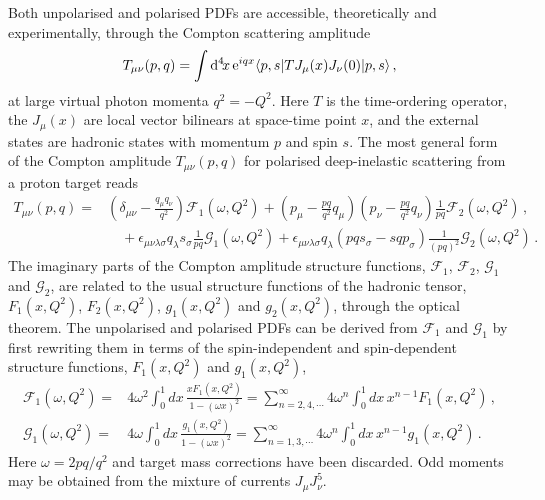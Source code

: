 Both unpolarised and polarised PDFs are accessible, theoretically and experimentally,
through the Compton scattering amplitude
\begin{equation}
T_{\mu\nu}(p,q) = \int {\rm d}^4\!x\, {\rm e}^{iqx}  \langle p,s |T J_\mu(x) J_\nu(0)|p,s\rangle   \, ,
\end{equation}
at large virtual photon momenta $q^2=-Q^2$. Here $T$ is the time-ordering operator, the $J_\mu(x)$ are local vector bilinears at space-time point $x$, and the external states are hadronic states with momentum $p$ and spin $s$.
%
The most general form of the Compton amplitude $T_{\mu\nu}(p,q)$ for polarised deep-inelastic scattering from a proton target reads
\begin{align}
T_{\mu\nu}(p,q) = {} & \left(\delta_{\mu\nu}-\frac{q_\mu q_\nu}{q^2}\right) \mathcal{F}_1(\omega,Q^2) + \left(p_\mu-\frac{pq}{q^2}q_\mu\right) \left(p_\nu-\frac{pq}{q^2}q_\nu\right) \frac{1}{pq} \mathcal{F}_2(\omega,Q^2)\,,\\ 
& {} \quad  + \epsilon_{\mu\nu\lambda\sigma}q_\lambda s_\sigma \frac{1}{pq}\mathcal{G}_1(\omega,Q^2) + \epsilon_{\mu\nu\lambda\sigma}q_\lambda \left(pq s_\sigma - sq p_\sigma\right) \frac{1}{(pq)^2}\mathcal{G}_2(\omega,Q^2)\,.
\end{align}
The imaginary parts of the Compton amplitude structure functions, $\mathcal{F}_1$, $\mathcal{F}_2$, $\mathcal{G}_1$ and $\mathcal{G}_2$, are related to the usual structure functions of the hadronic tensor, $F_1(x,Q^2)$, $F_2(x,Q^2)$, $g_1(x,Q^2)$ and $g_2(x,Q^2)$, through the optical theorem.
%
The unpolarised and polarised PDFs can be derived from $\mathcal{F}_1$ and $\mathcal{G}_1$ by first rewriting them in terms of the spin-independent and spin-dependent structure functions, $F_1(x,Q^2)$ and $g_1(x,Q^2)$,
\begin{align}
\mathcal{F}_1(\omega,Q^2) = {} & 4 \omega^2 \int_0^1 dx\,  \frac{xF_1(x,Q^2)}{1-(\omega x)^2} = \sum_{n=2,4,\cdots}^\infty 4\omega^n \int_0^1 dx\, x^{n-1} F_1(x,Q^2) \,, \\
\mathcal{G}_1(\omega,Q^2) = {} & 4 \omega \int_0^1 dx\, \frac{g_1(x,Q^2)}{1-(\omega x)^2} = \sum_{n=1,3,\cdots}^\infty 4\omega^n \int_0^1 dx\, x^{n-1} g_1(x,Q^2)\,.
\end{align}
Here $\omega=2pq/q^2$ and target mass corrections have been discarded. Odd moments may be obtained from the mixture of currents $J_\mu J_\nu^5$.


